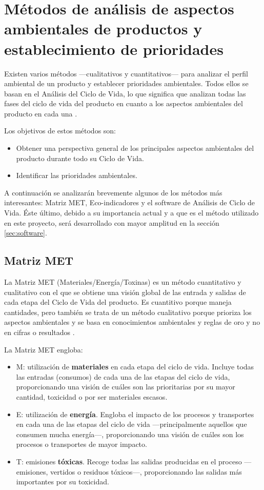 \section{Métodos de análisis de aspectos ambientales de productos y establecimiento de prioridades}

Existen varios métodos —cualitativos y cuantitativos— para analizar el perfil ambiental de un producto y establecer prioridades ambientales. Todos ellos se basan en el Análisis del Ciclo de Vida, lo que significa que analizan todas las fases del ciclo de vida del producto en cuanto a los aspectos ambientales del producto en cada una \cite{mlgceballos}.

Los objetivos de estos métodos son:
\begin{itemize}
  \item Obtener una perspectiva general de los principales aspectos ambientales del producto durante todo su Ciclo de Vida.
  \item Identificar las prioridades ambientales.
\end{itemize}

A continuación se analizarán brevemente algunos de los métodos más interesantes: Matriz MET, Eco-indicadores y el software de Análisis de Ciclo de Vida. Éste último, debido a su importancia actual y a que es el método utilizado en este proyecto, será desarrollado con mayor amplitud en la sección \ref{sec:software}.

\subsection{Matriz MET}

La Matriz MET (Materiales/Energía/Toxinas) es un método cuantitativo y cualitativo con el que se obtiene una visión global de las entrada y salidas de cada etapa del Ciclo de Vida del producto. Es cuantitivo porque maneja cantidades, pero también se trata de un método cualitativo porque prioriza los aspectos ambientales y se basa en conocimientos ambientales y reglas de oro y no en cifras o resultados \cite{ihobeeco}.

La Matriz MET engloba:
\begin{itemize}
  \item M: utilización de \textbf{materiales} en cada etapa del ciclo de vida. Incluye todas las entradas (consumos) de cada una de las etapas del ciclo de vida, proporcionando una visión de cuáles son las prioritarias por su mayor cantidad, toxicidad o por ser materiales escasos.
  \item E: utilización de \textbf{energía}. Engloba el impacto de los procesos y transportes en cada una de las etapas del ciclo de vida —principalmente aquellos que consumen mucha energía—, proporcionando una visión de cuáles son los procesos o transportes de mayor impacto.
  \item T: emisiones \textbf{tóxicas}. Recoge todas las salidas producidas en el proceso —emisiones, vertidos o residuos tóxicos—, proporcionando las salidas más importantes por su toxicidad.
\end{itemize}

